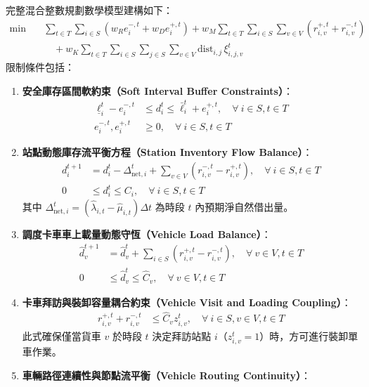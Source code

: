 完整混合整數規劃數學模型建構如下：
\begin{align}
\min \quad & \sum_{t \in T} \sum_{i \in S} \left( w_R e^{-, t}_i + w_D e^{+, t}_i \right) + w_M \sum_{t \in T} \sum_{i \in S} \sum_{v \in V} \left( r^{+, t}_{i,v} + r^{-, t}_{i,v} \right) \\
&\quad + w_K \sum_{t \in T} \sum_{i \in S} \sum_{j \in S} \sum_{v \in V} \text{dist}_{i,j} \, \xi^t_{i,j,v}
\end{align}
限制條件包括：
\begin{enumerate}
    \item \textbf{安全庫存區間軟約束（Soft Interval Buffer Constraints）}：
    \begin{align}
    \underline{\ell}^t_i - e^{-, t}_i &\le d^t_i \le \bar{\ell}^t_i + e^{+, t}_i, \quad \forall\ i \in S, t \in T \\
    e^{-, t}_i, e^{+, t}_i &\ge 0, \quad \forall\ i \in S, t \in T
    \end{align}
    \item \textbf{站點動態庫存流平衡方程（Station Inventory Flow Balance）}：
    \begin{align}
    d^{t+1}_i &= d^t_i - \Delta_{\text{net}, i}^t + \sum_{v \in V} \left( r^{-, t}_{i,v} - r^{+, t}_{i,v} \right), \quad \forall\ i \in S, t \in T \\
    0 &\le d^t_i \le C_i, \quad \forall\ i \in S, t \in T
    \end{align}
    其中 $\Delta_{\text{net}, i}^t = \left(\hat{\lambda}_{i,t} - \hat{\mu}_{i,t}\right) \Delta t$ 為時段 $t$ 內預期淨自然借出量。
    \item \textbf{調度卡車車上載量動態守恆（Vehicle Load Balance）}：
    \begin{align}
    \hat{d}^{t+1}_v &= \hat{d}^t_v + \sum_{i \in S} \left( r^{+, t}_{i,v} - r^{-, t}_{i,v} \right), \quad \forall\ v \in V, t \in T \\
    0 &\le \hat{d}^t_v \le \hat{C}_v, \quad \forall\ v \in V, t \in T
    \end{align}
    \item \textbf{卡車拜訪與裝卸容量耦合約束（Vehicle Visit and Loading Coupling）}：
    \begin{align}
    r^{+, t}_{i,v} + r^{-, t}_{i,v} &\le \hat{C}_v z^t_{i,v}, \quad \forall\ i \in S, v \in V, t \in T
    \end{align}
    此式確保僅當貨車 $v$ 於時段 $t$ 決定拜訪站點 $i$（$z^t_{i,v} = 1$）時，方可進行裝卸單車作業。
    \item \textbf{車輛路徑連續性與節點流平衡（Vehicle Routing Continuity）}：

\end{enumerate}
